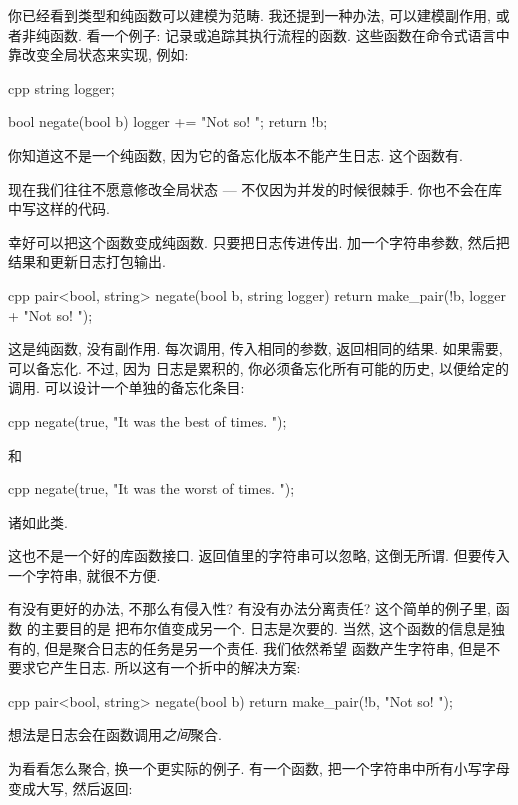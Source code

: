 
\lettrine[lhang=0.17]{你}{已经看到}类型和纯函数可以建模为范畴. 我还提到一种办法, 可以建模副作用, 或者非纯函数.
看一个例子: 记录或追踪其执行流程的函数. 这些函数在命令式语言中靠改变全局状态来实现, 例如:

\begin{snip}{cpp}
string logger;

bool negate(bool b) {
    logger += "Not so! ";
    return !b;
}
\end{snip}
你知道这不是一个纯函数, 因为它的备忘化版本不能产生日志. 这个函数有.

现在我们往往不愿意修改全局状态 --- 不仅因为并发的时候很棘手. 你也不会在库中写这样的代码.

幸好可以把这个函数变成纯函数. 只要把日志传进传出. 加一个字符串参数, 然后把结果和更新日志打包输出.

\begin{snip}{cpp}
pair<bool, string> negate(bool b, string logger) {
    return make_pair(!b, logger + "Not so! ");
}
\end{snip}
这是纯函数, 没有副作用. 每次调用, 传入相同的参数, 返回相同的结果. 如果需要, 可以备忘化. 不过, 因为
日志是累积的, 你必须备忘化所有可能的历史, 以便给定的调用. 可以设计一个单独的备忘化条目:

\begin{snip}{cpp}
negate(true, "It was the best of times. ");
\end{snip}
和

\begin{snip}{cpp}
negate(true, "It was the worst of times. ");
\end{snip}
诸如此类.

这也不是一个好的库函数接口. 返回值里的字符串可以忽略, 这倒无所谓. 但要传入一个字符串, 就很不方便.

有没有更好的办法, 不那么有侵入性? 有没有办法分离责任? 这个简单的例子里, 函数  的主要目的是
把布尔值变成另一个. 日志是次要的. 当然, 这个函数的信息是独有的, 但是聚合日志的任务是另一个责任. 我们依然希望
函数产生字符串, 但是不要求它产生日志. 所以这有一个折中的解决方案:

\begin{snip}{cpp}
pair<bool, string> negate(bool b) {
    return make_pair(!b, "Not so! ");
}
\end{snip}
想法是日志会在函数调用\emph{之间}聚合.

为看看怎么聚合, 换一个更实际的例子. 有一个函数, 把一个字符串中所有小写字母变成大写, 然后返回:

